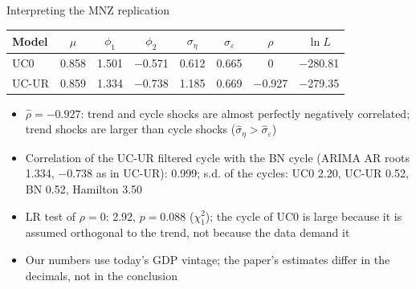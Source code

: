 \begin{frame}{Interpreting the MNZ replication}
\itemsize{\footnotesize}
\begin{center}
\footnotesize
\begin{tabular}{lccccccc}
\toprule
Model & $\mu$ & $\phi_1$ & $\phi_2$ & $\sigma_\eta$ & $\sigma_\varepsilon$ & $\rho$ & $\ln L$ \\
\midrule
UC0 & 0.858 & 1.501 & \ensuremath{-}0.571 & 0.612 & 0.665 & 0 & \ensuremath{-}280.81 \\
UC-UR & 0.859 & 1.334 & \ensuremath{-}0.738 & 1.185 & 0.669 & \ensuremath{-}0.927 & \ensuremath{-}279.35 \\
\bottomrule
\end{tabular}
\end{center}
\begin{itemize}
    \item $\hat\rho = \ensuremath{-}0.927$: trend and cycle shocks are almost perfectly negatively correlated; trend shocks are larger than cycle shocks ($\hat\sigma_\eta > \hat\sigma_\varepsilon$)
    \item Correlation of the UC-UR filtered cycle with the BN cycle (ARIMA AR roots 1.334, \ensuremath{-}0.738 as in UC-UR): 0.999; s.d. of the cycles: UC0 2.20, UC-UR 0.52, BN 0.52, Hamilton 3.50
    \item LR test of $\rho = 0$: 2.92, $p = 0.088$ ($\chi^2_1$); the cycle of UC0 is large because it is assumed orthogonal to the trend, not because the data demand it
    \item Our numbers use today's GDP vintage; the paper's estimates differ in the decimals, not in the conclusion
\end{itemize}
\end{frame}

